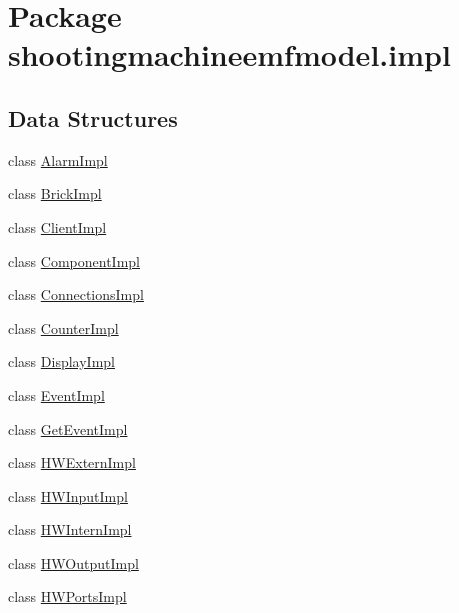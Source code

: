 \hypertarget{namespaceshootingmachineemfmodel_1_1impl}{\section{Package shootingmachineemfmodel.\-impl}
\label{namespaceshootingmachineemfmodel_1_1impl}
}
\subsection*{Data Structures}
\begin{DoxyCompactItemize}
\item 
class \hyperlink{classshootingmachineemfmodel_1_1impl_1_1_alarm_impl}{Alarm\-Impl}
\item 
class \hyperlink{classshootingmachineemfmodel_1_1impl_1_1_brick_impl}{Brick\-Impl}
\item 
class \hyperlink{classshootingmachineemfmodel_1_1impl_1_1_client_impl}{Client\-Impl}
\item 
class \hyperlink{classshootingmachineemfmodel_1_1impl_1_1_component_impl}{Component\-Impl}
\item 
class \hyperlink{classshootingmachineemfmodel_1_1impl_1_1_connections_impl}{Connections\-Impl}
\item 
class \hyperlink{classshootingmachineemfmodel_1_1impl_1_1_counter_impl}{Counter\-Impl}
\item 
class \hyperlink{classshootingmachineemfmodel_1_1impl_1_1_display_impl}{Display\-Impl}
\item 
class \hyperlink{classshootingmachineemfmodel_1_1impl_1_1_event_impl}{Event\-Impl}
\item 
class \hyperlink{classshootingmachineemfmodel_1_1impl_1_1_get_event_impl}{Get\-Event\-Impl}
\item 
class \hyperlink{classshootingmachineemfmodel_1_1impl_1_1_h_w_extern_impl}{H\-W\-Extern\-Impl}
\item 
class \hyperlink{classshootingmachineemfmodel_1_1impl_1_1_h_w_input_impl}{H\-W\-Input\-Impl}
\item 
class \hyperlink{classshootingmachineemfmodel_1_1impl_1_1_h_w_intern_impl}{H\-W\-Intern\-Impl}
\item 
class \hyperlink{classshootingmachineemfmodel_1_1impl_1_1_h_w_output_impl}{H\-W\-Output\-Impl}
\item 
class \hyperlink{classshootingmachineemfmodel_1_1impl_1_1_h_w_ports_impl}{H\-W\-Ports\-Impl}
\item 

\end{DoxyCompactItemize}
